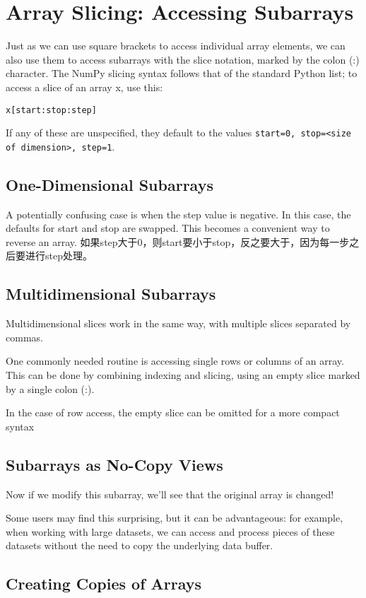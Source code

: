 \section{Array Slicing: Accessing Subarrays}
Just as we can use square brackets to access individual array elements, we can also use
them to access subarrays with the slice notation, marked by the colon (:) character.
The NumPy slicing syntax follows that of the standard Python list; to access a slice of
an array x, use this:

\verb|x[start:stop:step]|

If any of these are unspecified, they default to the values \verb|start=0, stop=<size of dimension>, step=1|.

\subsection{One-Dimensional Subarrays}
A potentially confusing case is when the step value is negative. In this case, the
defaults for start and stop are swapped. This becomes a convenient way to reverse
an array. 如果step大于0，则start要小于stop，反之要大于，因为每一步之后要进行step处理。
\subsection{Multidimensional Subarrays}
Multidimensional slices work in the same way, with multiple slices separated by commas.

One commonly needed routine is accessing single rows or columns of an array. This
can be done by combining indexing and slicing, using an empty slice marked by a
single colon (:).

In the case of row access, the empty slice can be omitted for a more compact syntax
\subsection{Subarrays as No-Copy Views}

Now if we modify this subarray, we'll see that the original array is changed!

Some users may find this surprising, but it can be advantageous: for example, when
working with large datasets, we can access and process pieces of these datasets
without the need to copy the underlying data buffer.
\subsection{Creating Copies of Arrays}

